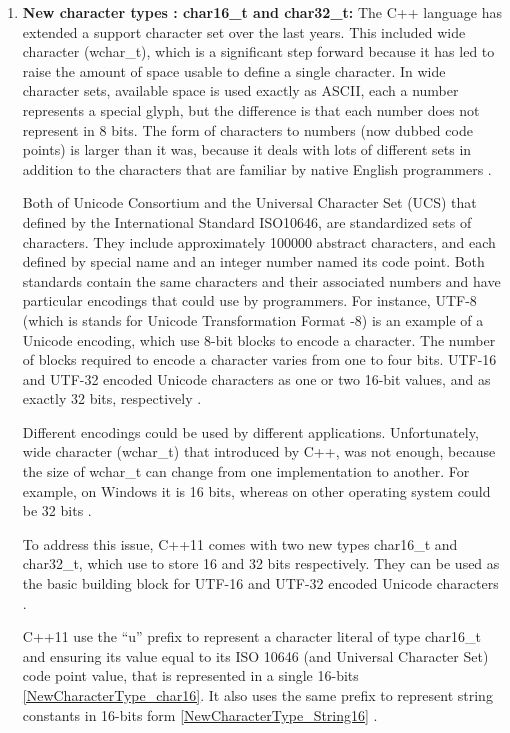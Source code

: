 \documentclass[11pt]{report}
\begin{document}
\begin{enumerate}
\item \textbf{New character types : char16\_t and char32\_t:} The C++ language has extended a support character set over the last years. This included wide character (wchar\_t), which is a significant step forward because it has led to raise the amount of space usable to define a single character. In wide character sets, available space is used exactly as ASCII, each a number represents a special glyph, but the difference is that each number does not represent in 8 bits. The form of characters to numbers (now dubbed code points) is larger than it was, because it deals with lots of different sets in addition to the characters that are familiar by native English programmers \cite{Gregorie:professionalcpp}.
\newline

Both of Unicode Consortium and the Universal Character Set (UCS) that defined by the International Standard ISO10646, are standardized sets of characters. They include approximately 100000 abstract characters, and each defined by special name and an integer number named its code point. Both standards contain the same characters and their associated numbers and have particular encodings that could use by programmers. For instance, UTF-8 (which is stands for Unicode Transformation Format -8) is an example of a Unicode encoding, which use 8-bit blocks to encode a character. The number of blocks required to encode a character varies from one to four bits.  UTF-16 and UTF-32 encoded Unicode characters as one or two 16-bit values, and as exactly 32 bits, respectively \cite{Gregorie:professionalcpp}.
\newline

Different encodings could be used by different applications. Unfortunately, wide character (wchar\_t) that introduced by C++, was not enough, because the size of wchar\_t can change from one implementation to another. For example, on Windows it is 16 bits, whereas on other operating system could be 32 bits \cite{Gregorie:professionalcpp}. 
\newline

To address this issue, C++11 comes with two new types char16\_t and char32\_t, which use to store 16 and 32 bits respectively. They can be used as the basic building block for UTF-16 and UTF-32 encoded Unicode characters \cite{Josuttis:2012:CppStandardLibrary}.
\newline

C++11 use the “u” prefix to represent a character literal of type char16\_t and ensuring its value equal to its ISO 10646 (and Universal Character Set) code point value, that is represented in a single 16-bits \ref{NewCharacterType_char16}. It also uses the same prefix to represent string constants in 16-bits form \ref{NewCharacterType_String16} \cite{Josuttis2012:CppStandardLibrary}.
\newline


\end{enumerate}
\end{document}
